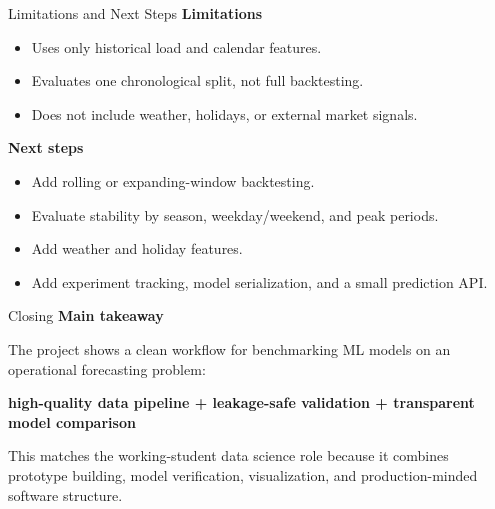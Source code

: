 \documentclass[aspectratio=169]{beamer}
\begin{document}
\begin{frame}{Limitations and Next Steps}
    \textbf{Limitations}
    \begin{itemize}
        \item Uses only historical load and calendar features.
        \item Evaluates one chronological split, not full backtesting.
        \item Does not include weather, holidays, or external market signals.
    \end{itemize}

    \vspace{0.25cm}
    \textbf{Next steps}
    \begin{itemize}
        \item Add rolling or expanding-window backtesting.
        \item Evaluate stability by season, weekday/weekend, and peak periods.
        \item Add weather and holiday features.
        \item Add experiment tracking, model serialization, and a small prediction API.
    \end{itemize}
\end{frame}

\begin{frame}{Closing}
    \Large
    \textbf{Main takeaway}

    \vspace{0.4cm}
    \normalsize
    The project shows a clean workflow for benchmarking ML models on an operational forecasting problem:

    \vspace{0.25cm}
    \centering
    \textbf{high-quality data pipeline + leakage-safe validation + transparent model comparison}

    \vspace{0.45cm}
    \raggedright
    This matches the working-student data science role because it combines prototype building, model verification, visualization, and production-minded software structure.
\end{frame}
\end{document}
